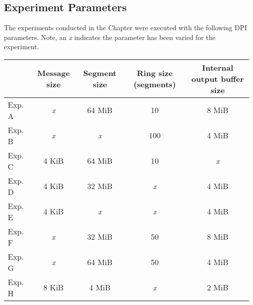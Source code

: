
\begin{appendices}

\makeatletter
{}

\chapter{Experiment Parameters}
\label{appendix:experiment_parameters}
The experiments conducted in the  Chapter were executed with the following DPI parameters. Note, an \textit{x} indicates the parameter has been varied for the experiment.

\begin{tabular}{|l|c|c|c|c|}
    \hline
     & Message size & Segment size & Ring size (segments) & Internal output buffer size \\
    \hline
    Exp. A & \textit{x} & 64 MiB & 10 & 8 MiB \\
    Exp. B & \textit{x} & \textit{x} & 100 & 4 MiB \\
    Exp. C & 4 KiB & 64 MiB & 10 & \textit{x} \\
    Exp. D & 4 KiB & 32 MiB & \textit{x} & 4 MiB \\
    Exp. E & 4 KiB & \textit{x} & \textit{x} & 4 MiB \\
    Exp. F & \textit{x} & 32 MiB & 50 & 8 MiB \\
    Exp. G & \textit{x} & 64 MiB & 50 & 4 MiB \\
    Exp. H & 8 KiB & 4 MiB & \textit{x} & 2 MiB \\
    \hline
\end{tabular}



\end{appendices}